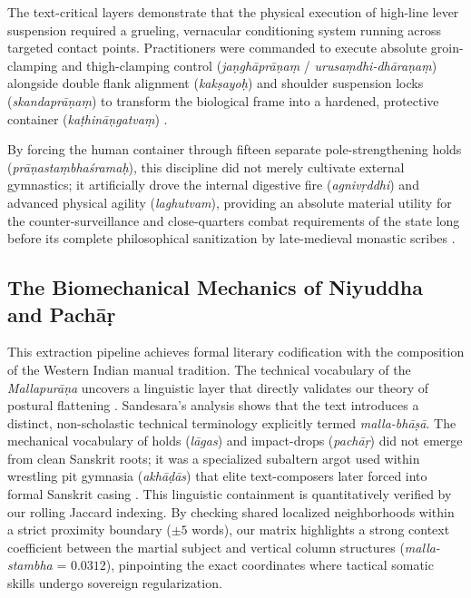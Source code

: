 \documentclass[11pt,twoside,letterpaper]{article}
\begin{document}
The text-critical layers demonstrate that the physical execution of high-line lever suspension required a grueling, vernacular conditioning system running across targeted contact points. Practitioners were commanded to execute absolute groin-clamping and thigh-clamping control (\textit{ja\d{n}gh\={a}pr\={a}\d{n}a\d{m}} / \textit{urusa\d{m}dhi-dh\={a}ra\d{n}a\d{m}}) alongside double flank alignment (\textit{kak\d{s}ayo\d{h}}) and shoulder suspension locks (\textit{skandapr\={a}\d{n}a\d{m}}) to transform the biological frame into a hardened, protective container (\textit{ka\d{t}hin\={a}\d{n}gatva\d{m}}) \citep{MP_7_v10}. 

By forcing the human container through fifteen separate pole-strengthening holds (\textit{pr\={a}\d{n}asta\d{m}bha\'srama\d{h}}), this discipline did not merely cultivate external gymnastics; it artificially drove the internal digestive fire (\textit{agniv\d{r}ddhi}) and advanced physical agility (\textit{laghutvam}), providing an absolute material utility for the counter-surveillance and close-quarters combat requirements of the state long before its complete philosophical sanitization by late-medieval monastic scribes \citep{MP_7_v11, Thomas2025}.


\subsection{The Biomechanical Mechanics of Niyuddha and Pach\={a}\d{r}}
This extraction pipeline achieves formal literary codification with the composition of the Western Indian manual tradition. The technical vocabulary of the \textit{Mallapur\={a}\d{n}a} uncovers a linguistic layer that directly validates our theory of postural flattening \citep{MP_7_v12}. Sandesara’s analysis shows that the text introduces a distinct, non-scholastic technical terminology explicitly termed \textit{malla-bh\={a}\d{s}\={a}}. The mechanical vocabulary of holds (\textit{l\={a}gas}) and impact-drops (\textit{pach\={a}\d{r}}) did not emerge from clean Sanskrit roots; it was a specialized subaltern argot used within wrestling pit gymnasia (\textit{akh\={a}\d{d}\={a}s}) that elite text-composers later forced into formal Sanskrit casing \citep{Sandesara1948}. This linguistic containment is quantitatively verified by our rolling Jaccard indexing. By checking shared localized neighborhoods within a strict proximity boundary ($\pm 5$ words), our matrix highlights a strong context coefficient between the martial subject and vertical column structures (\textit{malla-stambha} = $0.0312$), pinpointing the exact coordinates where tactical somatic skills undergo sovereign regularization.
\end{document}
